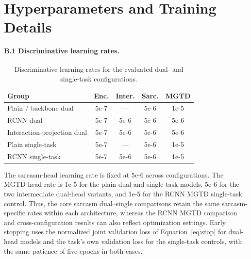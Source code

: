 \section{Hyperparameters and Training Details}
\label{app:hyper}

\paragraph{B.1 Discriminative learning rates.}

\begin{table}[h]
  \centering
  \small
  \begin{tabular}{@{}p{2.4cm}cccc@{}}
    \toprule
    \textbf{Group} & \textbf{Enc.} & \textbf{Inter.} & \textbf{Sarc.} & \textbf{MGTD} \\
    \midrule
    Plain / backbone dual & 5e-7 & --- & 5e-6 & 1e-5 \\
    RCNN dual & 5e-7 & 5e-6 & 5e-6 & 5e-6 \\
    Interaction-projection dual & 5e-7 & 5e-6 & 5e-6 & 5e-6 \\
    Plain single-task & 5e-7 & --- & 5e-6 & 1e-5 \\
    RCNN single-task & 5e-7 & 5e-6 & 5e-6 & 1e-5 \\
    \bottomrule
  \end{tabular}
  \caption{Discriminative learning rates for the evaluated dual- and single-task configurations.}
  \label{tab:lr}
\end{table}

The sarcasm-head learning rate is fixed at 5e-6 across configurations. The MGTD-head rate is 1e-5 for the plain dual and single-task models, 5e-6 for the two intermediate dual-head variants, and 1e-5 for the RCNN MGTD single-task control. Thus, the core sarcasm dual--single comparisons retain the same sarcasm-specific rates within each architecture, whereas the RCNN MGTD comparison and cross-configuration results can also reflect optimization settings. Early stopping uses the normalized joint validation loss of Equation~\ref{eq:stop} for dual-head models and the task's own validation loss for the single-task controls, with the same patience of five epochs in both cases.

